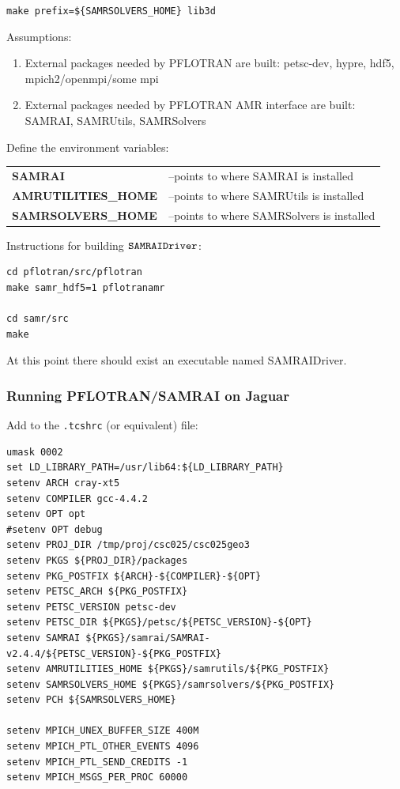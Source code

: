 \documentclass[12pt]{article}
\begin{document}
\verb|make prefix=${SAMRSOLVERS_HOME} lib3d|

\noindent
Assumptions:
\begin{enumerate}
\item External packages needed by PFLOTRAN are built: petsc-dev, hypre,  
hdf5, \linebreak mpich2/openmpi/some mpi
\item External packages needed by PFLOTRAN AMR interface are built:  
SAMRAI, SAMRUtils, SAMRSolvers
\end{enumerate}

\noindent
Define the environment variables:
\begin{center}
\begin{tabularx}{\linewidth}{lX}
\bf SAMRAI &--points to where SAMRAI is installed\\
\bf AMRUTILITIES\_HOME &--points to where SAMRUtils is installed\\
\bf SAMRSOLVERS\_HOME &--points to where SAMRSolvers is installed
\end{tabularx}
\end{center}

\noindent
Instructions for building $\verb|SAMRAIDriver|$:
\begin{center}
\begin{verbatim}
cd pflotran/src/pflotran
make samr_hdf5=1 pflotranamr

cd samr/src
make
\end{verbatim}
\end{center}

\noindent
At this point there should exist an executable named SAMRAIDriver.

\subsubsection{Running PFLOTRAN/SAMRAI on Jaguar}

Add to the {\tt .tcshrc} (or equivalent) file:
\begin{verbatim}
umask 0002
set LD_LIBRARY_PATH=/usr/lib64:${LD_LIBRARY_PATH}
setenv ARCH cray-xt5
setenv COMPILER gcc-4.4.2
setenv OPT opt
#setenv OPT debug 
setenv PROJ_DIR /tmp/proj/csc025/csc025geo3
setenv PKGS ${PROJ_DIR}/packages
setenv PKG_POSTFIX ${ARCH}-${COMPILER}-${OPT}
setenv PETSC_ARCH ${PKG_POSTFIX} 
setenv PETSC_VERSION petsc-dev
setenv PETSC_DIR ${PKGS}/petsc/${PETSC_VERSION}-${OPT}
setenv SAMRAI ${PKGS}/samrai/SAMRAI-v2.4.4/${PETSC_VERSION}-${PKG_POSTFIX}
setenv AMRUTILITIES_HOME ${PKGS}/samrutils/${PKG_POSTFIX}
setenv SAMRSOLVERS_HOME ${PKGS}/samrsolvers/${PKG_POSTFIX}
setenv PCH ${SAMRSOLVERS_HOME} 
 
setenv MPICH_UNEX_BUFFER_SIZE 400M
setenv MPICH_PTL_OTHER_EVENTS 4096
setenv MPICH_PTL_SEND_CREDITS -1
setenv MPICH_MSGS_PER_PROC 60000
\end{verbatim}
\end{document}

